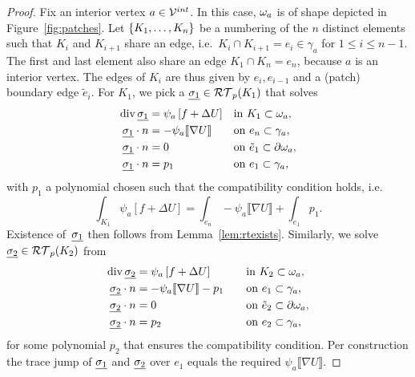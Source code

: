 \documentclass[thesis.tex]{subfiles}
\begin{document}
\begin{proof}
  Fix an interior vertex $a \in \mathcal{V}^{int}$. In this case, $\omega_a$ is of shape depicted in Figure~\ref{fig:patches}. Let $\set{K_1,\dots,K_n}$ be a numbering
  of the $n$ distinct elements such that $K_i$ and $K_{i+1}$ share an edge, 
  i.e.~$K_i \cap K_{i+1} =e_i \in \gamma_a$ for $1 \leq i \leq n-1$. The first and last element also share an edge $K_1 \cap K_n = e_n$,
  because $a$ is an interior vertex. The edges of $K_i$ are thus given by $e_i, e_{i-1}$ and a (patch) boundary edge $\tilde e_i$. 
  For $K_1$, we pick a $\underline{\sigma_1}\in \mathcal{RT}_p(K_1)$ that solves 
  \begin{equation}
    \label{eq:first}
  \begin{alignedat}{3}
    \operatorname{div} \underline{\sigma_1} &= \psi_a \left [f + \Delta U\right] && \quad\text{in }  K_1\subset \omega_a ,\\
    \underline{\sigma_1} \cdot n  &=-\psi_a \llbracket \nabla U \rrbracket && \quad \text{on } e_n \subset \gamma_a,\\
    \underline{\sigma_1} \cdot n  &= 0 && \quad \text{on } \tilde e_1 \subset \partial \omega_a,\\
    \underline{\sigma_1} \cdot n  &= p_1 && \quad \text{on } e_{1} \subset \gamma_a,
  \end{alignedat}
\end{equation}
  with $p_1$ a polynomial chosen such that the compatibility condition holds, i.e.
  \[
    \int_{K_1} \psi_a \left[ f + \Delta U\right] = \int_{e_n} - \psi_a \llbracket \nabla U \rrbracket + \int_{e_1} p_1.
  \]  
  Existence of~$\underline{\sigma_1}$
  then follows from Lemma~\ref{lem:rtexists}. Similarly, we solve $\underline{\sigma_2} \in \mathcal{RT}_p(K_2)$ from
  \begin{alignat*}{3}
    \operatorname{div} \underline{\sigma_2} &= \psi_a \left [f + \Delta U\right] && \quad\text{in }  K_2\subset \omega_a ,\\
     \underline{\sigma_2} \cdot n  &= -\psi_a \llbracket \nabla U \rrbracket - p_1 && \quad \text{on } e_1 \subset \gamma_a,\\
    \underline{\sigma_2} \cdot n  &= 0 && \quad \text{on } \tilde e_2 \subset \partial \omega_a,\\
    \underline{\sigma_2} \cdot n  &= p_2 && \quad \text{on } e_{2} \subset \gamma_a,
  \end{alignat*}
  for some polynomial $p_2$ that ensures the compatibility condition. Per construction the trace jump of $\underline{\sigma_1}$ and $\underline{\sigma_2}$ over
  $e_1$ equals the required $\psi_a \llbracket \nabla U \rrbracket$.
  

\end{proof}
\end{document}
